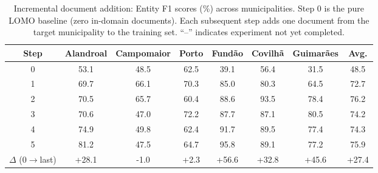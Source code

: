 \begin{table}[t]
\centering
\caption{Incremental document addition: Entity F1 scores (\%) across municipalities. Step 0 is the pure LOMO baseline (zero in-domain documents). Each subsequent step adds one document from the target municipality to the training set. ``--'' indicates experiment not yet completed.}
\label{tab:incremental_f1}
\small
\begin{tabular}{cccccccc}
\toprule
\textbf{Step} & \textbf{Alandroal} & \textbf{Campomaior} & \textbf{Porto} & \textbf{Fundão} & \textbf{Covilhã} & \textbf{Guimarães} & \textbf{Avg.} \\
\midrule
0 & 53.1 & 48.5 & 62.5 & 39.1 & 56.4 & 31.5 & 48.5 \\
1 & 69.7 & 66.1 & 70.3 & 85.0 & 80.3 & 64.5 & 72.7 \\
2 & 70.5 & 65.7 & 60.4 & 88.6 & 93.5 & 78.4 & 76.2 \\
3 & 70.6 & 47.0 & 72.2 & 87.7 & 87.1 & 80.5 & 74.2 \\
4 & 74.9 & 49.8 & 62.4 & 91.7 & 89.5 & 77.4 & 74.3 \\
5 & 81.2 & 47.5 & 64.7 & 95.8 & 89.1 & 77.2 & 75.9 \\
\midrule
$\Delta$ (0$\to$last) & +28.1 & -1.0 & +2.3 & +56.6 & +32.8 & +45.6 & +27.4 \\
\bottomrule
\end{tabular}
\end{table}